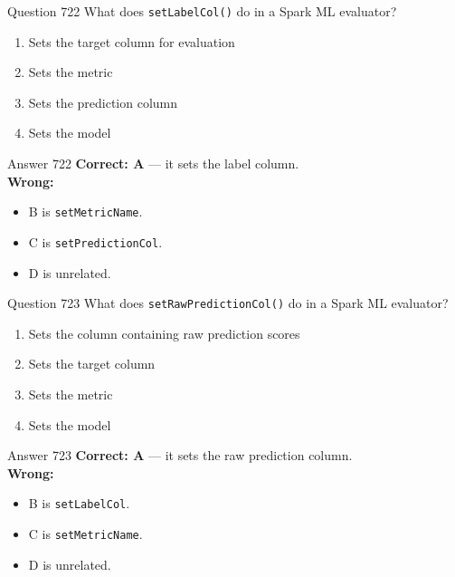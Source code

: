 \documentclass[aspectratio=169,11pt]{beamer}
\begin{document}
	\begin{frame}{Question 722}
		What does \texttt{setLabelCol()} do in a Spark ML evaluator?
		\begin{enumerate}[label=\Alph*.]
			\item Sets the target column for evaluation
			\item Sets the metric
			\item Sets the prediction column
			\item Sets the model
		\end{enumerate}
	\end{frame}
	\begin{frame}{Answer 722}
		\textbf{Correct: A} --- it sets the label column.\\
		\vspace{0.5em}
		\textbf{Wrong:}
		\begin{itemize}
			\item B is \texttt{setMetricName}.
			\item C is \texttt{setPredictionCol}.
			\item D is unrelated.
		\end{itemize}
	\end{frame}
	
	\begin{frame}{Question 723}
		What does \texttt{setRawPredictionCol()} do in a Spark ML evaluator?
		\begin{enumerate}[label=\Alph*.]
			\item Sets the column containing raw prediction scores
			\item Sets the target column
			\item Sets the metric
			\item Sets the model
		\end{enumerate}
	\end{frame}
	\begin{frame}{Answer 723}
		\textbf{Correct: A} --- it sets the raw prediction column.\\
		\vspace{0.5em}
		\textbf{Wrong:}
		\begin{itemize}
			\item B is \texttt{setLabelCol}.
			\item C is \texttt{setMetricName}.
			\item D is unrelated.
		\end{itemize}
	\end{frame}
	
\end{document}

